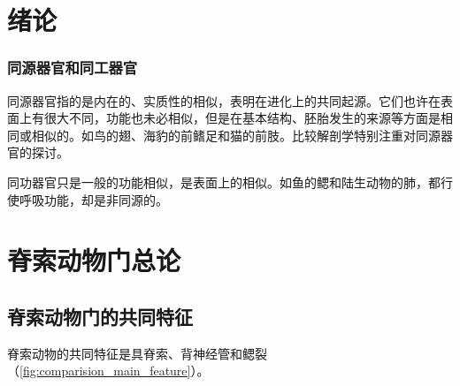 \section{绪论}

\subsubsection{同源器官和同工器官}

同源器官指的是内在的、实质性的相似，表明在进化上的共同起源。它们也许在表面上有很大不同，功能也未必相似，但是在基本结构、胚胎发生的来源等方面是相同或相似的。如鸟的翅、海豹的前鳍足和猫的前肢。比较解剖学特别注重对同源器官的探讨。

同功器官只是一般的功能相似，是表面上的相似。如鱼的鳃和陆生动物的肺，都行使呼吸功能，却是非同源的。

\section{脊索动物门总论}

\subsection{脊索动物门的共同特征}

脊索动物的共同特征是具脊索、背神经管和鳃裂（\autoref{fig:comparision_main_feature}）。

